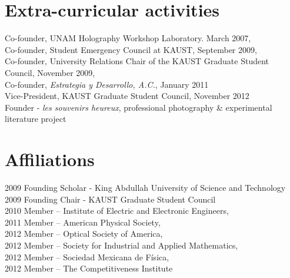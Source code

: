 \documentclass[margin]{res}
\begin{document}
\section{Extra-curricular activities}
Co-founder, UNAM Holography Workshop Laboratory. March 2007,\\
Co-founder, Student Emergency Council at KAUST, September 2009, \\
Co-founder, University Relations Chair of the KAUST  Graduate Student Council, November 2009, \\
Co-founder,  \emph{Estrategia y Desarrollo, A.C.}, January 2011\\
Vice-President, KAUST  Graduate Student Council, November 2012 \\ 
Founder - \emph{les souvenirs heureux}, professional photography & experimental literature project\\


\section{Affiliations}
2009 Founding Scholar - King Abdullah University of Science and Technology\\
2009 Founding Chair - KAUST Graduate Student Council\\
2010 Member -- Institute of Electric and Electronic Engineers,\\
2011 Member -- American Physical Society,\\
2012 Member -- Optical Society of America,\\
2012 Member -- Society for Industrial and Applied Mathematics,\\
2012 Member -- Sociedad Mexicana de Física,\\
2012 Member -- The Competitiveness Institute 
\end{document}
